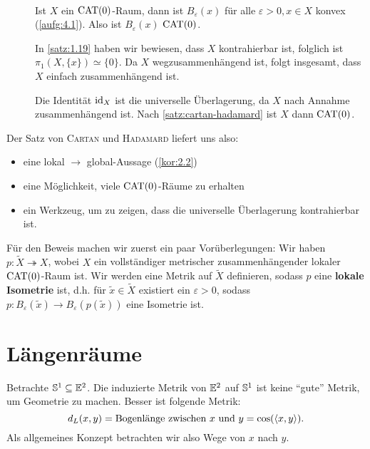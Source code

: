 \begin{beweis}
	\mbox{} \\[-.9cm]
	\begin{description}
		\item[\bewrueck] Ist $X$ ein $\operatorname{CAT(0)}$-Raum, dann ist $B_\varepsilon(x)$ für alle $\varepsilon > 0, x \in X$ konvex (\autoref{aufg:4.1}). Also ist $B_\varepsilon(x)$ $\operatorname{CAT(0)}$.
		
		In \autoref{satz:1.19} haben wir bewiesen, dass $X$ kontrahierbar ist, folglich ist $\pi_1(X,\{x\}) \simeq \{0\}$.
		Da $X$ wegzusammenhängend ist, folgt insgesamt, dass $X$ einfach zusammenhängend ist.
		\item[\bewhin] Die Identität $\operatorname{id}_X$ ist die universelle Überlagerung, da $X$ nach Annahme zusammenhängend ist. Nach \autoref{satz:cartan-hadamard} ist $X$ dann $\operatorname{CAT(0)}$. \qedhere
	\end{description}
\end{beweis}

Der Satz von \textsc{Cartan} und \textsc{Hadamard} liefert uns also:
\begin{itemize}
	\item eine lokal $\rightarrow$ global-Aussage (\autoref{kor:2.2})
	\item eine Möglichkeit, viele $\operatorname{CAT(0)}$-Räume zu erhalten
	\item ein Werkzeug, um zu zeigen, dass die universelle Überlagerung kontrahierbar ist.
\end{itemize}

Für den Beweis machen wir zuerst ein paar Vorüberlegungen: Wir haben $p \colon \tilde{X} \twoheadrightarrow X$, wobei $X$ ein vollständiger metrischer zusammenhängender lokaler $\operatorname{CAT(0)}$-Raum ist. Wir werden eine Metrik auf $\tilde{X}$ definieren, sodass $p$ eine \textbf{lokale Isometrie} ist, d.h. für $\tilde{x} \in \tilde{X}$ existiert ein $\varepsilon > 0$, sodass $p \colon B_\varepsilon(\tilde{x}) \rightarrow B_\varepsilon(p(\tilde{x}))$ eine Isometrie ist.

\section{Längenräume}
\label{sec:2.1}
	Betrachte $\mathbb{S}^1 \subseteq \mathbb{E}^2$. Die induzierte Metrik von $\mathbb{E}^2$ auf $\mathbb{S}^1$ ist keine \enquote{gute} Metrik, um Geometrie zu machen. Besser ist folgende Metrik:
	\[
		d_L(x,y) = \text{Bogenlänge zwischen } x \text{ und } y = \cos(\langle x,y\rangle).
	\]
	Als allgemeines Konzept betrachten wir also Wege von $x$ nach $y$.
	
